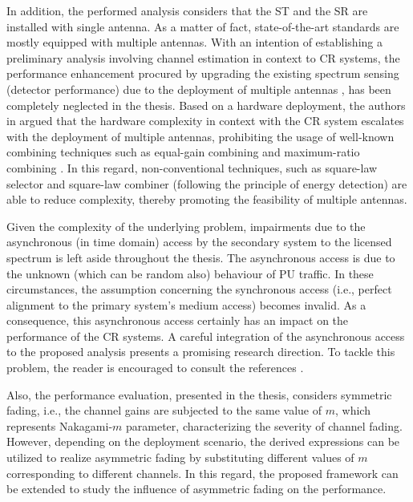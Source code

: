In addition, the performed analysis considers that the ST and the SR are installed with single antenna. As a matter of fact, state-of-the-art standards are mostly equipped with multiple antennas. With an intention of establishing a preliminary analysis involving channel estimation in context to CR systems, the performance enhancement procured by upgrading the existing spectrum sensing (detector performance) due to the deployment of multiple antennas \cite{Dig07,Tah10}, has been completely neglected in the thesis. Based on a hardware deployment, the authors in  argued that the hardware complexity in context with the CR system escalates with the deployment of multiple antennas, prohibiting the usage of well-known combining techniques such as equal-gain combining and maximum-ratio combining \cite{Alouini03}. In this regard, non-conventional techniques, such as square-law selector and square-law combiner (following the principle of energy detection) are able to reduce complexity, thereby promoting the feasibility of multiple antennas. 

Given the complexity of the underlying problem, impairments due to the asynchronous (in time domain) access by the secondary system to the licensed spectrum is left aside throughout the thesis. The asynchronous access is due to the unknown (which can be random also) behaviour of PU traffic. In these circumstances, the assumption concerning the synchronous access (i.e., perfect alignment to the primary system's medium access) becomes invalid. As a consequence, this asynchronous access certainly has an impact on the performance of the CR systems. A careful integration of the asynchronous access to the proposed analysis presents a promising research direction. To tackle this problem, the reader is encouraged to consult the references \cite{Jiang13_, Jiang15}.

Also, the performance evaluation, presented in the thesis, considers symmetric fading, i.e., the channel gains are subjected to the same value of $m$, which represents Nakagami-$m$ parameter, characterizing the severity of channel fading. However, depending on the deployment scenario, the derived expressions can be utilized to realize asymmetric fading \cite{Sura08} by substituting different values of $m$ corresponding to different channels. In this regard, the proposed framework can be extended to study the influence of asymmetric fading on the performance. 

